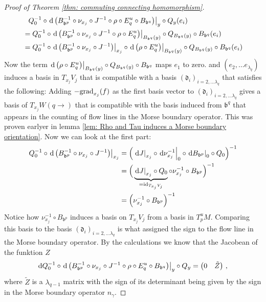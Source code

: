 \begin{proof}[Proof of Theorem \ref{thm: commuting connecting homomorphism}]
		
		\begin{align*}
			&\phantom{=}Q_0^{-1}\circ \left.\mathop{}\!\mathrm{d} \left(B_{\mathfrak{b}^p}^{-1} \circ \nu_{x_j}\circ J^{-1}\circ \rho \circ E^u_q\circ B_{\mathfrak{b}^q}\right)\right|_{y}\circ Q_y (e_i)\\
			&=Q_0^{-1}\circ  \left.\mathop{}\!\mathrm{d} \left(B_{\mathfrak{b}^p}^{-1} \circ \nu_{x_j}\circ J^{-1}\circ \rho \circ E^u_q\right)\right|_{B_{\mathfrak{b}^q}(y)}\circ Q_{B_{\mathfrak{b}^q}(y)}\circ B_{\mathfrak{b}^q}(e_i) \\
			&= Q_0^{-1}\circ \left.\mathop{}\!\mathrm{d} \left(B_{\mathfrak{b}^p}^{-1} \circ \nu_{x_j}\circ J^{-1}\right)\right|_{x_j}\circ \left.\mathop{}\!\mathrm{d} \left( \rho \circ E^u_q\right)\right|_{B_{\mathfrak{b}^q}(y)}\circ Q_{B_{\mathfrak{b}^q}(y)}\circ B_{\mathfrak{b}^q}(e_i)		
		\end{align*}
		Now the term $\left.\mathop{}\!\mathrm{d} \left( \rho \circ E^u_q\right)\right|_{B_{\mathfrak{b}^q}(y)}\circ Q_{B_{\mathfrak{b}^q}(y)}\circ B_{\mathfrak{b}^q}$ maps $e_1$ to zero. and $(e_2,\dots e_{\lambda_q})$
		induces a basis in $T_{x_j}V_j$ that is compatible with a basis $(\mathfrak{d}_i)_{i=2,\dots \lambda_q}$ that satisfies the following: Adding $-\mathrm{grad}_{x_j}(f)$ as the first basis vector to $(\mathfrak{d}_i)_{i=2,\dots \lambda_q}$ gives a basis of $T_{x_j}W(q\to)$ that is compatible with the basis induced from $\mathfrak{b}^q$ that appears in the counting of flow lines in the Morse boundary operator. This was proven earlyer in lemma \ref{lem: Rho and Tau induces a Morse boundary orientation}.
		Now we can look at the first part: 
		\begin{align*}
			Q_0^{-1}\circ \left.\mathop{}\!\mathrm{d} \left(B_{\mathfrak{b}^p}^{-1} \circ \nu_{x_j}\circ J^{-1}\right)\right|_{x_j}
			&=\Big(\left.\mathop{}\!\mathrm{d} J\right|_{x_j}\circ \left.\mathop{}\!\mathrm{d} \nu_{x_j}^{-1}\right|_{0}\circ \left.\mathop{}\!\mathrm{d} B_{\mathfrak{b}^p}\right|_{0} \circ Q_0 \Big)^{-1}\\
			&=\Big(\underbrace{\left.\mathop{}\!\mathrm{d} J\right|_{x_j}\circ Q_{0}}_{=\operatorname{\mathrm{id}}_{T_{x_j}V_j}} \circ \nu_{x_j}^{-1}  \circ B_{\mathfrak{b}^p} \Big)^{-1}\\	
			&=\Big( \nu_{x_j}^{-1}  \circ B_{\mathfrak{b}^p} \Big)^{-1}
		\end{align*}
		Notice how $\nu_{x_j}^{-1}  \circ B_{\mathfrak{b}^p}$ induces a basis on $T_{x_j}V_j$ from a basis in $T^u_pM$. Comparing this basis to the basis  $(\mathfrak{d}_i)_{i=2,\dots \lambda_q}$ is what assigned the sign to the flow line in the Morse boundary operator. By the calculations we know that the Jacobean of the funktion $Z$ 
		\begin{equation*}
			\mathop{}\!\mathrm{d} Q_0^{-1}\circ \left.\mathop{}\!\mathrm{d} \left(B_{\mathfrak{b}^p}^{-1} \circ \nu_{x_j}\circ J^{-1}\circ \rho \circ E^u_q\circ B_{\mathfrak{b}^q}\right)\right|_{y}\circ Q_y=
			\begin{pmatrix}
				0&\tilde{Z}
			\end{pmatrix}\,,
		\end{equation*}where $\tilde{Z}$ is a $\lambda_{q-1}$ matrix with the sign of its determinant being given by the sign in the Morse boundary operator $n_{\gamma}$. 
		

\end{proof}

